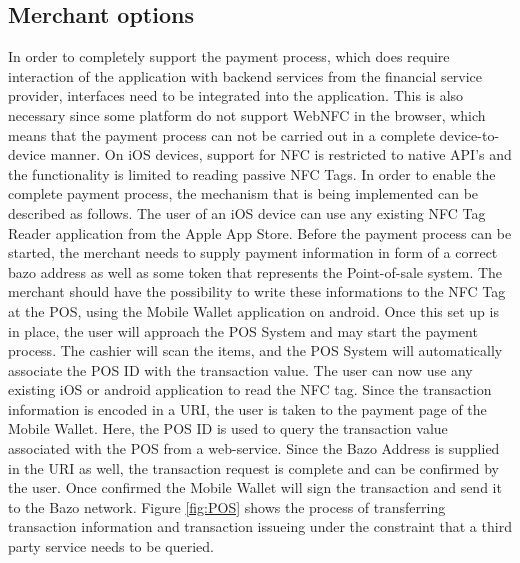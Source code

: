 \subsection{Merchant options}\label{merchantoptions}
In order to completely support the payment process, which does require interaction of the application with backend services from the financial service provider, interfaces need to be integrated into the application.
This is also necessary since some platform do not support WebNFC in the browser, which means that the payment process can not be carried out in a complete device-to-device manner. On iOS devices, support for NFC is restricted to native API's and the functionality is limited to reading passive NFC Tags.
In order to enable the complete payment process, the mechanism that is being implemented can be described as follows. The user of an iOS device can use any existing NFC Tag Reader application from the Apple App Store. Before the payment process can be started, the merchant needs to supply payment information in form of a correct bazo address as well as some token that represents the Point-of-sale system. The merchant should have the possibility to write these informations to the NFC Tag at the POS, using the Mobile Wallet application on android.
Once this set up is in place, the user will approach the POS System and may start the payment process. The cashier will scan the items, and the POS System will automatically associate the POS ID with the transaction value. The user can now use any existing iOS or android application to read the NFC tag. Since the transaction information is encoded in a URI, the user is taken to the payment page of the Mobile Wallet. Here, the POS ID is used to query the transaction value associated with the POS from a web-service. Since the Bazo Address is supplied in the URI as well, the transaction request is complete and can be confirmed by the user. Once confirmed the Mobile Wallet will sign the transaction and send it to the Bazo network. Figure
\ref{fig:POS} shows the process of transferring transaction information and transaction issueing under the constraint that a third party service needs to be queried.

